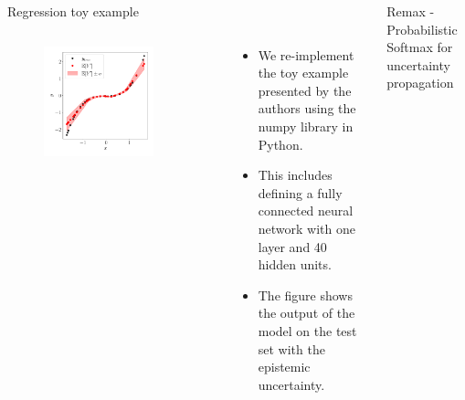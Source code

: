 \documentclass[final]{beamer}
\begin{document}
\begin{frame}[t]
\begin{columns}
\begin{column}[T]{.31\textwidth}
\begin{block}{Regression toy example}
\begin{columns}
\begin{column}{0.5\textwidth}
  \begin{figure}[h!]
 \centering
  \includegraphics[width=0.8\textwidth]{Figures/toy_example.pdf}
 \end{figure}
 \end{column}
 \begin{column}{0.5\textwidth}
 \begin{itemize}
 \item We re-implement the toy example presented by the authors using the numpy library in Python.
 \item This includes defining a fully connected neural network with one layer and 40 hidden units.
 \item The figure shows the output of the model on the test set with the epistemic uncertainty.
\end{itemize}
 \end{column}
\end{columns}
\end{block}
\end{column}
\begin{column}[T]{.31\textwidth}

\begin{block}{Remax - Probabilistic Softmax for uncertainty propagation}\vspace{0pt}\centering


\end{block}
\end{column}
\end{columns}
\end{frame}
\end{document}
